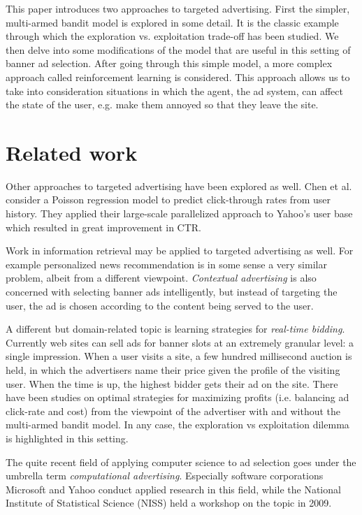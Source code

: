\documentclass{article} %
\begin{document}
This paper introduces two approaches to targeted advertising. First the
simpler, multi-armed bandit model is explored in some detail. It is the classic
example through which the exploration vs.  exploitation trade-off has been
studied. We then delve into some modifications of the model that are useful in
this setting of banner ad selection. After going through this simple model, a
more complex approach called reinforcement learning is considered. This
approach allows us to take into consideration situations in which the agent,
the ad system, can affect the state of the user, e.g. make them annoyed so that
they leave the site.

\section{Related work}

Other approaches to targeted advertising have been explored as well. Chen et
al. \cite{chen2009large} consider a Poisson regression model to predict
click-through rates from user history.  They applied their large-scale
parallelized approach to Yahoo's user base which resulted in great improvement
in CTR.

Work in information retrieval may be applied to targeted advertising as well.
For example personalized news recommendation is in some sense a very similar
problem, albeit from a different viewpoint. \emph{Contextual advertising} is
also concerned with selecting banner ads intelligently, but instead of
targeting the user, the ad is chosen according to the content being served to
the user.

A different but domain-related topic is learning strategies for
\emph{real-time bidding}. Currently web sites can sell ads for banner slots at
an extremely granular level: a single impression. When a user visits a site, a
few hundred millisecond auction is held, in which the advertisers name their
price given the profile of the visiting user. When the time is up, the highest
bidder gets their ad on the site. There have been studies on optimal strategies
for maximizing profits (i.e. balancing ad click-rate and cost) from the
viewpoint of the advertiser with \cite{ding2013multi} and without
\cite{chakraborty2010selective} the multi-armed bandit model. In any case, the
exploration vs exploitation dilemma is highlighted in this setting.

The quite recent field of applying computer science to ad selection goes under
the umbrella term \emph{computational advertising}. Especially software
corporations Microsoft and Yahoo conduct applied research in this field, while
the National Institute of Statistical Science (NISS) held a workshop on the
topic in 2009. %
\end{document}
